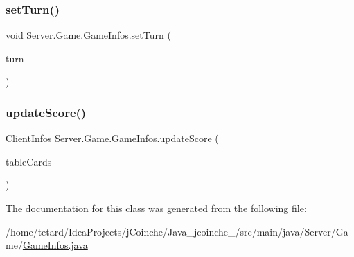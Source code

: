 \mbox{\label{classServer_1_1Game_1_1GameInfos_a24e034a63f163cee0e142a248edaaa91}} 
\subsubsection{\texorpdfstring{set\+Turn()}{setTurn()}}
{\footnotesize\ttfamily void Server.\+Game.\+Game\+Infos.\+set\+Turn (\begin{DoxyParamCaption}\item[{int}]{turn }\end{DoxyParamCaption})\hspace{0.3cm}{\ttfamily [inline]}}

\mbox{\label{classServer_1_1Game_1_1GameInfos_a29835c070042dbf7eaea067e6c9acbf4}} 
\subsubsection{\texorpdfstring{update\+Score()}{updateScore()}}
{\footnotesize\ttfamily \mbox{\hyperlink{classServer_1_1ServerConnexion_1_1ClientInfos}{Client\+Infos}} Server.\+Game.\+Game\+Infos.\+update\+Score (\begin{DoxyParamCaption}\item[{Hash\+Map$<$ \mbox{\hyperlink{classServer_1_1ServerConnexion_1_1ClientInfos}{Client\+Infos}}, \mbox{\hyperlink{classCommon_1_1Card}{Card}} $>$}]{table\+Cards }\end{DoxyParamCaption})\hspace{0.3cm}{\ttfamily [inline]}}



The documentation for this class was generated from the following file\+:\begin{DoxyCompactItemize}
\item 
/home/tetard/\+Idea\+Projects/j\+Coinche/\+Java\+\_\+jcoinche\+\_/src/main/java/\+Server/\+Game/\mbox{\hyperlink{GameInfos_8java}{Game\+Infos.\+java}}\end{DoxyCompactItemize}
